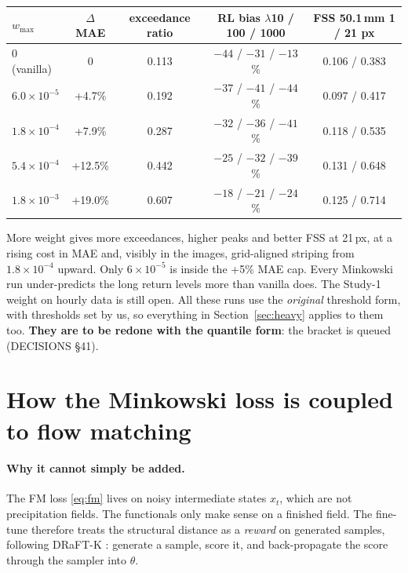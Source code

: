 \documentclass[11pt,a4paper]{article}
\begin{document}
\begin{center}\small\begin{tabular}{lcccc}\toprule
$w_{\max}$ & $\Delta$MAE & exceedance ratio & RL bias $\lambda$10 / 100 / 1000 & FSS 50.1\,mm 1 / 21 px\\\midrule
0 (vanilla) & 0 & 0.113 & $-44$ / $-31$ / $-13$\% & 0.106 / 0.383\\
$6.0\times10^{-5}$ & +4.7\% & 0.192 & $-37$ / $-41$ / $-44$\% & 0.097 / 0.417\\
$1.8\times10^{-4}$ & +7.9\% & 0.287 & $-32$ / $-36$ / $-41$\% & 0.118 / 0.535\\
$5.4\times10^{-4}$ & +12.5\% & 0.442 & $-25$ / $-32$ / $-39$\% & 0.131 / 0.648\\
$1.8\times10^{-3}$ & +19.0\% & 0.607 & $-18$ / $-21$ / $-24$\% & 0.125 / 0.714\\\bottomrule
\end{tabular}\end{center}

\noindent More weight gives more exceedances, higher peaks and better FSS at 21\,px, at a rising cost in MAE and,
visibly in the images, grid-aligned striping from $1.8\times10^{-4}$ upward. Only $6\times10^{-5}$ is inside the +5\% MAE
cap. Every Minkowski run under-predicts the long return levels more than vanilla does. The Study-1 weight on hourly
data is still open. All these runs use the \emph{original} threshold form, with thresholds set by us, so everything in
Section~\ref{sec:heavy} applies to them too. \textbf{They are to be redone with the quantile form}: the bracket is queued
(DECISIONS \S41).

\section{How the Minkowski loss is coupled to flow matching}\label{sec:coupling}

\paragraph{Why it cannot simply be added.} The FM loss \eqref{eq:fm} lives on noisy intermediate states $x_t$, which are
not precipitation fields. The functionals only make sense on a finished field. The fine-tune therefore treats the
structural distance as a \emph{reward} on generated samples, following DRaFT-K \citep{clark2024draft}: generate a
sample, score it, and back-propagate the score through the sampler into $\theta$.
\end{document}
